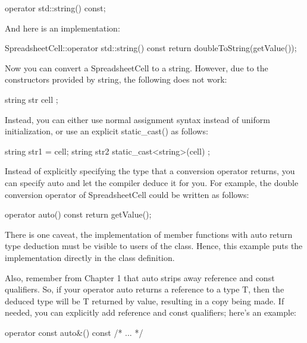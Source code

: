 \begin{cpp}
operator std::string() const;
\end{cpp}

And here is an implementation:

\begin{cpp}
SpreadsheetCell::operator std::string() const
{
    return doubleToString(getValue());
}
\end{cpp}

Now you can convert a SpreadsheetCell to a string. However, due to the constructors provided by string, the following does not work:

\begin{cpp}
string str { cell };
\end{cpp}

Instead, you can either use normal assignment syntax instead of uniform initialization, or use an explicit static\_cast() as follows:

\begin{cpp}
string str1 = cell;
string str2 { static_cast<string>(cell) };
\end{cpp}



Instead of explicitly specifying the type that a conversion operator returns, you can specify auto and let the compiler deduce it for you. For example, the double conversion operator of SpreadsheetCell could be written as follows:

\begin{cpp}
operator auto() const { return getValue(); }
\end{cpp}

There is one caveat, the implementation of member functions with auto return type deduction must be visible to users of the class. Hence, this example puts the implementation directly in the class definition.

Also, remember from Chapter 1 that auto strips away reference and const qualifiers. So, if your operator auto returns a reference to a type T, then the deduced type will be T returned by value, resulting in a copy being made. If needed, you can explicitly add reference and const qualifiers; here’s an example:

\begin{cpp}
operator const auto&() const { /* ... */ }
\end{cpp}


